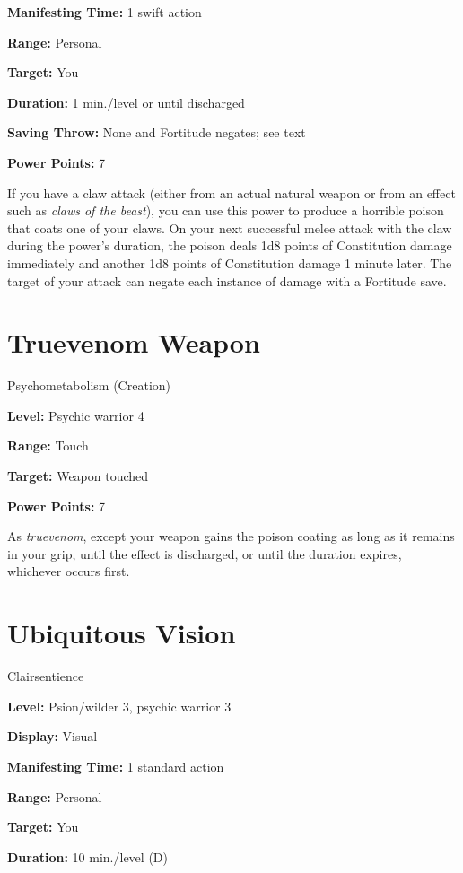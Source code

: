 \documentclass{article}
\begin{document}
\textbf{Manifesting Time:} 1 swift action

\textbf{Range:} Personal

\textbf{Target:} You

\textbf{Duration:} 1 min./level or until discharged

\textbf{Saving Throw:} None and Fortitude negates; see text

\textbf{Power Points:} 7

If you have a claw attack (either from an actual natural weapon or from an effect 
such as \textit{claws of the beast}), you can use this power to produce a horrible 
poison that coats one of your claws. On your next successful melee attack with 
the claw during the power's duration, the poison deals 1d8 points of Constitution 
damage immediately and another 1d8 points of Constitution damage 1 minute later. 
The target of your attack can negate each instance of damage with a Fortitude save.

\vspace{12pt}
\section*{Truevenom Weapon}

Psychometabolism (Creation)

\textbf{Level:} Psychic warrior 4

\textbf{Range:} Touch

\textbf{Target:} Weapon touched

\textbf{Power Points:} 7

As \textit{truevenom}, except your weapon gains the poison coating as long as it 
remains in your grip, until the effect is discharged, or until the duration expires, 
whichever occurs first.

\vspace{12pt}
\section*{Ubiquitous Vision}

Clairsentience

\textbf{Level:} Psion/wilder 3, psychic warrior 3

\textbf{Display:} Visual

\textbf{Manifesting Time:} 1 standard action

\textbf{Range:} Personal

\textbf{Target:} You

\textbf{Duration:} 10 min./level (D)
\end{document}
